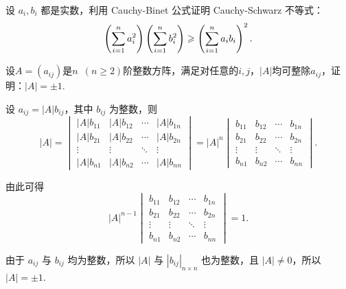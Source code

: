 \begin{exercise}
\begin{exgroup}
        \item 设 $a_i, b_i$ 都是实数，利用 Cauchy-Binet 公式证明 Cauchy-Schwarz 不等式：
        \[
            \left( \sum_{i=1}^{n}\limits a_i^2 \right) \left( \sum_{i=1}^{n}\limits b_i^2 \right) \geqslant \left( \sum_{i=1}^{n}\limits a_i b_i \right)^2.
        \]
        \item 设$A=(a_{ij})$是$n\enspace(n\geqslant 2)$阶整数方阵，满足对任意的$i,j$，$|A|$均可整除$a_{ij}$，证明：$|A|=\pm 1$.
        \begin{answer}
            设 $a_{ij} = |A| b_{ij}$，其中 $b_{ij}$ 为整数，则
            \[
                |A| = \begin{vmatrix}
                    |A| b_{11} & |A| b_{12} & \cdots & |A| b_{1n} \\
                    |A| b_{21} & |A| b_{22} & \cdots & |A| b_{2n} \\
                    \vdots     & \vdots     & \ddots & \vdots     \\
                    |A| b_{n1} & |A| b_{n2} & \cdots & |A| b_{nn}
                \end{vmatrix}
                = |A|^n \begin{vmatrix}
                    b_{11} & b_{12} & \cdots & b_{1n} \\
                    b_{21} & b_{22} & \cdots & b_{2n} \\
                    \vdots & \vdots & \ddots & \vdots \\
                    b_{n1} & b_{n2} & \cdots & b_{nn}
                \end{vmatrix}.
            \]

            由此可得
            \[
                |A|^{n-1} \begin{vmatrix}
                    b_{11} & b_{12} & \cdots & b_{1n} \\
                    b_{21} & b_{22} & \cdots & b_{2n} \\
                    \vdots & \vdots & \ddots & \vdots \\
                    b_{n1} & b_{n2} & \cdots & b_{nn}
                \end{vmatrix} = 1.
            \]

            由于 $a_{ij}$ 与 $b_{ij}$ 均为整数，所以 $|A|$ 与 $|b_{ij}|_{n \times n}$ 也为整数，且 $|A| \neq 0$，所以 $|A| = \pm 1$.
        \end{answer}


\end{exgroup}
\end{exercise}
